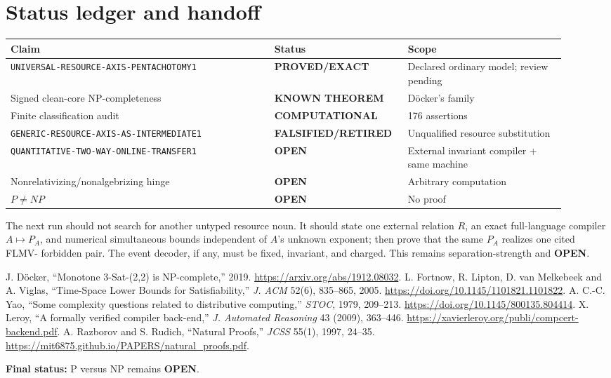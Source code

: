 \documentclass[11pt]{article}
\newcommand{\EXACT}{\textbf{PROVED/EXACT}}
\newcommand{\KNOWN}{\textbf{KNOWN THEOREM}}
\newcommand{\COMP}{\textbf{COMPUTATIONAL}}
\newcommand{\OPEN}{\textbf{OPEN}}
\newcommand{\RETIRED}{\textbf{FALSIFIED/RETIRED}}
\begin{document}
\section{Status ledger and handoff}
\begin{center}\scriptsize
\begin{tabular}{@{}p{0.45\linewidth}p{0.20\linewidth}p{0.27\linewidth}@{}}
\toprule
Claim & Status & Scope\\ \midrule
\texttt{UNIVERSAL-RESOURCE-AXIS-PENTACHOTOMY1} & \EXACT & Declared ordinary model; review pending\\
Signed clean-core NP-completeness & \KNOWN & D\"ocker's family\\
Finite classification audit & \COMP & 176 assertions\\
\texttt{GENERIC-RESOURCE-AXIS-AS-INTERMEDIATE1} & \RETIRED & Unqualified resource substitution\\
\texttt{QUANTITATIVE-TWO-WAY-ONLINE-TRANSFER1} & \OPEN & External invariant compiler + same machine\\
Nonrelativizing/nonalgebrizing hinge & \OPEN & Arbitrary computation\\
$P\ne NP$ & \OPEN & No proof\\
\bottomrule
\end{tabular}
\end{center}

The next run should not search for another untyped resource noun.  It should
state one external relation $R$, an exact full-language compiler
$A\mapsto P_A$, and numerical simultaneous bounds independent of $A$'s
unknown exponent; then prove that the same $P_A$ realizes one cited FLMV-
forbidden pair.  The event decoder, if any, must be fixed, invariant, and
charged.  This remains separation-strength and \OPEN.

\begin{thebibliography}{9}
 J. D\"ocker, ``Monotone 3-Sat-(2,2) is NP-complete,''
2019. \url{https://arxiv.org/abs/1912.08032}.
 L. Fortnow, R. Lipton, D. van Melkebeek and A. Viglas,
``Time-Space Lower Bounds for Satisfiability,'' \emph{J. ACM} 52(6),
835--865, 2005. \url{https://doi.org/10.1145/1101821.1101822}.
 A. C.-C. Yao, ``Some complexity questions related to
distributive computing,'' \emph{STOC}, 1979, 209--213.
\url{https://doi.org/10.1145/800135.804414}.
 X. Leroy, ``A formally verified compiler back-end,''
\emph{J. Automated Reasoning} 43 (2009), 363--446.
\url{https://xavierleroy.org/publi/compcert-backend.pdf}.
 A. Razborov and S. Rudich, ``Natural Proofs,''
\emph{JCSS} 55(1), 1997, 24--35.
\url{https://mit6875.github.io/PAPERS/natural_proofs.pdf}.
\end{thebibliography}

\noindent\textbf{Final status:} P versus NP remains \OPEN.

\end{document}
